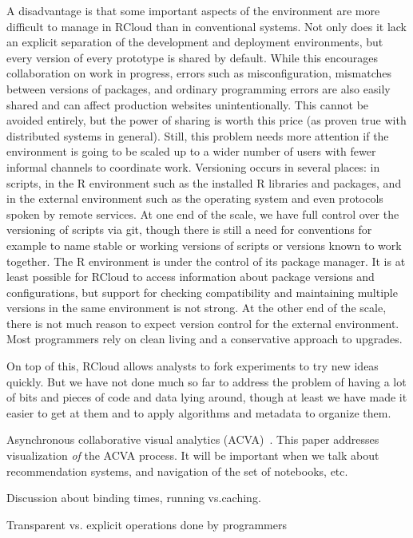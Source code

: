 A disadvantage is that some important aspects of the environment
are more difficult to manage in RCloud than in conventional systems.
Not only does it lack an explicit separation of the development and
deployment environments, but every version of every prototype is
shared by default. While this encourages collaboration on work
in progress, errors such as misconfiguration, mismatches between
versions of packages, and ordinary programming errors are also
easily shared and can affect production websites unintentionally.
This cannot be avoided entirely, but the power of sharing is worth
this price (as proven true with distributed systems in general).
Still, this problem needs more attention if the environment is
going to be scaled up to a wider number of users with fewer
informal channels to coordinate work. 
Versioning occurs in several places: in scripts, in the R environment
such as the installed R libraries and packages, and in the external
environment such as the operating system and even protocols spoken by
remote services. At one end of the scale, we have full control over the
versioning of scripts via git, though there is still a need for conventions
for example to name stable or working versions of scripts or versions known
to work together. The R environment is under the control of its package
manager. It is at least possible for RCloud to access information about
package versions and configurations, but support for checking compatibility
and maintaining multiple versions in the same environment is not strong.
At the other end of the scale, there is not much reason to expect version
control for the external environment. Most programmers rely on clean living
and a conservative approach to upgrades.

On top of this, RCloud allows analysts to fork experiments to try
new ideas quickly. But we have not done much so far to address the
problem of having a lot of bits and pieces of code and data lying
around, though at least we have made it easier to get at them and
to apply algorithms and metadata to organize them.

Asynchronous collaborative visual analytics
(ACVA)~\cite{Chen:2011:SEC}. This paper addresses visualization
\emph{of} the ACVA process. It will be important when we talk about
recommendation systems, and navigation of the set of notebooks, etc.

Discussion about binding times, running vs.caching.

Transparent vs. explicit operations done by programmers

